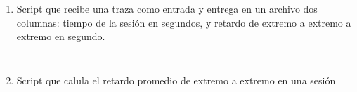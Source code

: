 \begin{enumerate}
  \item Script que recibe una traza como entrada y entrega en un archivo dos columnas: tiempo de la sesi\'on en segundos, 
  y retardo de extremo a extremo a extremo en segundo.
  \begin{figure}[H]
    \centering
    \begin{lstlisting}[frame=single, breaklines=true, basicstyle=\footnotesize\ttfamily, breakatwhitespace=false, 
        columns=flexible, tabsize=2, showstringspaces=false, language=AWK] 
  
    \end{lstlisting}
    \label{fig:scriptTiempoSesionRetardoExtremoExtremo}
  \end{figure}

  \item Script que calula el retardo promedio de extremo a extremo en una sesi\'on
  \begin{figure}[H]
    \centering
    \begin{lstlisting}[frame=single, breaklines=true, basicstyle=\footnotesize\ttfamily, breakatwhitespace=false, 
        columns=flexible, tabsize=2, showstringspaces=false, language=AWK] 
  
    \end{lstlisting}
    \label{fig:scriptRetardoExtremoExtremoSesion}
  \end{figure}
\end{enumerate}